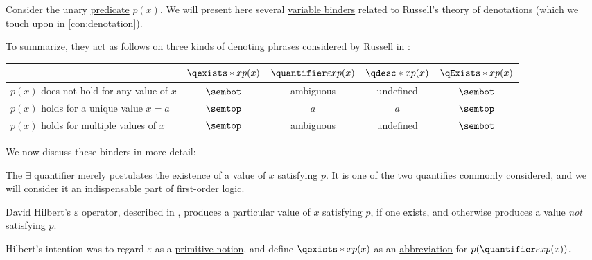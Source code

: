 \begin{concept}\label{con:description_operator}
  Consider the unary \hyperref[con:predicate_logic/predicate]{predicate} \( p(x) \). We will present here several \hyperref[con:variable_binding]{variable binders} related to Russell's theory of denotations (which we touch upon in \cref{con:denotation}).

  To summarize, they act as follows on three kinds of denoting phrases considered by Russell in \cite{Russell1905OnDenoting}:
  \begin{center}
    \begin{tabular}{l c c c c}
      \toprule
                                                        & \( \qexists* x p(x) \) & \( \quantifier \varepsilon x p(x) \) & \( \qdesc* x p(x) \) & \( \qExists* x p(x) \) \\
      \midrule
      \( p(x) \) does not hold for any value of \( x \) & \( \sembot \)          & ambiguous                            & undefined            & \( \sembot \) \\
      \( p(x) \) holds for a unique value \( x = a \)   & \( \semtop \)          & \( a \)                              & \( a \)              & \( \semtop \) \\
      \( p(x) \) holds for multiple values of \( x \)   & \( \semtop \)          & ambiguous                            & undefined            & \( \sembot \) \\
      \bottomrule
    \end{tabular}
  \end{center}

  We now discuss these binders in more detail:
  \begin{thmenum}
     The \( \exists \) quantifier merely postulates the existence of a value of \( x \) satisfying \( p \). It is one of the two quantifies commonly considered, and we will consider it an indispensable part of first-order logic.

     David Hilbert's \( \varepsilon \) operator, described in \cite{Leisenring1969MathematicalLogic}, produces a particular value of \( x \) satisfying \( p \), if one exists, and otherwise produces a value \emph{not} satisfying \( p \).

    Hilbert's intention was to regard \( \varepsilon \) as a \hyperref[con:primitive_notion]{primitive notion}, and define \( \qexists* x p(x) \) as an \hyperref[con:syntactic_abbreviation]{abbreviation} for \( p(\quantifier \varepsilon x p(x)) \).


\end{thmenum}
\end{concept}
